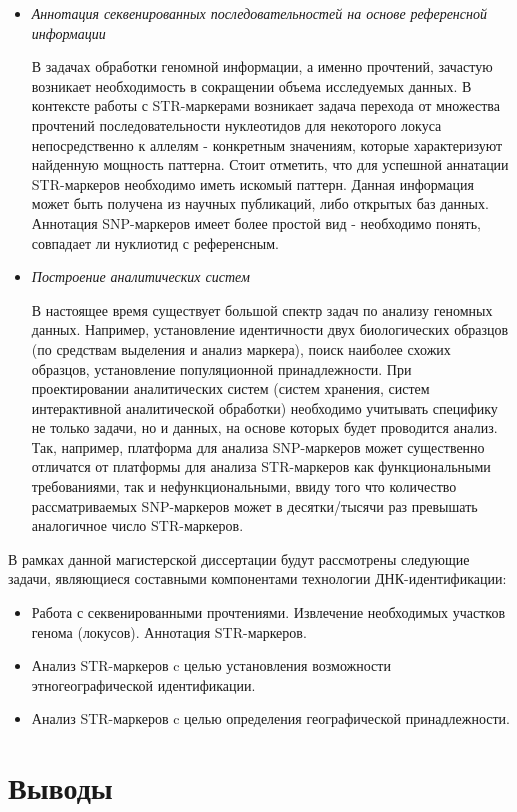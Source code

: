 \begin{itemize}
\item \textit{Аннотация секвенированных последовательностей на основе референсной информации}

В задачах обработки геномной информации, а именно прочтений, зачастую возникает необходимость в
сокращении объема исследуемых данных. В контексте работы с STR-маркерами возникает задача перехода
от множества прочтений последовательности нуклеотидов для некоторого локуса непосредственно к аллелям -
конкретным значениям, которые характеризуют найденную мощность паттерна.
Стоит отметить, что для успешной аннатации STR-маркеров необходимо иметь искомый паттерн. Данная информация
может быть получена из научных публикаций, либо открытых баз данных.
Аннотация SNP-маркеров имеет более простой вид - необходимо понять, совпадает ли нуклиотид с референсным.

\item \textit{Построение аналитических систем}

В настоящее время существует большой спектр задач по анализу геномных данных.
Например, установление идентичности двух биологических образцов (по средствам выделения и анализ маркера),
поиск наиболее схожих образцов, установление популяционной принадлежности.
При проектировании аналитических систем (систем хранения, систем интерактивной аналитической обработки)
необходимо учитывать специфику не только задачи, но и данных, на основе которых будет проводится анализ.
Так, например, платформа для анализа SNP-маркеров может существенно отличатся от платформы для анализа STR-маркеров
как функциональными требованиями, так и нефункциональными, ввиду того что количество рассматриваемых SNP-маркеров
может в десятки/тысячи раз превышать аналогичное число STR-маркеров.

\end{itemize}

В рамках данной магистерской диссертации будут рассмотрены следующие задачи,
являющиеся составными компонентами технологии ДНК-идентификации:

\begin{itemize}

\item Работа с секвенированными прочтениями.
Извлечение необходимых участков генома (локусов). Аннотация STR-маркеров.

\item Анализ STR-маркеров c целью установления возможности этногеографической идентификации.

\item Анализ STR-маркеров c целью определения географической принадлежности.

\end{itemize}

\section{Выводы}
